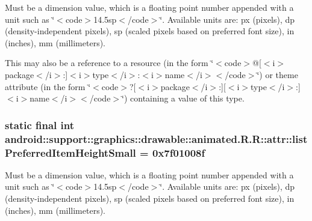 Must be a dimension value, which is a floating point number appended with a unit such as \char`\"{}$<$code$>$14.5sp$<$/code$>$\char`\"{}. Available units are: px (pixels), dp (density-independent pixels), sp (scaled pixels based on preferred font size), in (inches), mm (millimeters). 

This may also be a reference to a resource (in the form \char`\"{}$<$code$>$@\mbox{[}$<$i$>$package$<$/i$>$:\mbox{]}$<$i$>$type$<$/i$>$:$<$i$>$name$<$/i$>$$<$/code$>$\char`\"{}) or theme attribute (in the form \char`\"{}$<$code$>$?\mbox{[}$<$i$>$package$<$/i$>$:\mbox{]}\mbox{[}$<$i$>$type$<$/i$>$:\mbox{]}$<$i$>$name$<$/i$>$$<$/code$>$\char`\"{}) containing a value of this type. \hypertarget{classandroid_1_1support_1_1graphics_1_1drawable_1_1animated_1_1_r_1_1attr_7ee5ac7b3aa22c552ed6161e5c567f4c}{
\subsubsection[{listPreferredItemHeightSmall}]{\setlength{\rightskip}{0pt plus 5cm}static final int android::support::graphics::drawable::animated.R.R::attr::listPreferredItemHeightSmall = 0x7f01008f}}
\label{classandroid_1_1support_1_1graphics_1_1drawable_1_1animated_1_1_r_1_1attr_7ee5ac7b3aa22c552ed6161e5c567f4c}


Must be a dimension value, which is a floating point number appended with a unit such as \char`\"{}$<$code$>$14.5sp$<$/code$>$\char`\"{}. Available units are: px (pixels), dp (density-independent pixels), sp (scaled pixels based on preferred font size), in (inches), mm (millimeters). 

